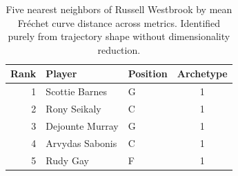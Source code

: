 \begin{table}[htbp]
  \centering\small
  \begin{tabular}{rllc}
    \toprule
    Rank & Player & Position & Archetype \\
    \midrule
    1 & Scottie Barnes & G & 1 \\
    2 & Rony Seikaly & C & 1 \\
    3 & Dejounte Murray & G & 1 \\
    4 & Arvydas Sabonis & C & 1 \\
    5 & Rudy Gay & F & 1 \\
    \bottomrule
  \end{tabular}
  \caption{Five nearest neighbors of Russell Westbrook by mean Fr\'{e}chet curve distance across metrics. Identified purely from trajectory shape without dimensionality reduction.}
  \label{tab:Russell_Westbrook_frechet_curve_neighbors}
\end{table}

